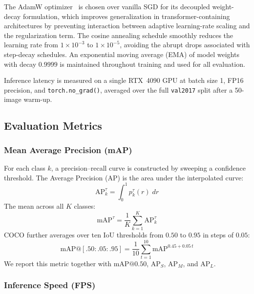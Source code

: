 The AdamW optimizer~\cite{loshchilov2019decoupled} is chosen
over vanilla SGD for its decoupled weight-decay formulation,
which improves generalization in transformer-containing
architectures by preventing interaction between adaptive
learning-rate scaling and the regularization term.  The cosine
annealing schedule smoothly reduces the learning rate from
$1 \times 10^{-3}$ to $1 \times 10^{-5}$, avoiding the abrupt
drops associated with step-decay schedules.  An exponential
moving average (EMA) of model weights with decay $0.9999$ is
maintained throughout training and used for all evaluation.

Inference latency is measured on a single RTX~4090 GPU at
batch size 1, FP16 precision, and \texttt{torch.no\_grad()},
averaged over the full \texttt{val2017} split after a 50-image
warm-up.

\subsection{Evaluation Metrics}

\subsubsection{Mean Average Precision (mAP)}

For each class $k$, a precision--recall curve is constructed
by sweeping a confidence threshold.  The Average Precision
(AP) is the area under the interpolated curve:
\begin{equation}
    \text{AP}_{k}^{\tau} =
    \int_{0}^{1} p_{k}^{\tau}(r)\; dr
    \label{eq:ap}
\end{equation}
The mean across all $K$ classes:
\begin{equation}
    \text{mAP}^{\tau} =
    \frac{1}{K}\sum_{k=1}^{K} \text{AP}_{k}^{\tau}
    \label{eq:map_tau}
\end{equation}
COCO further averages over ten IoU thresholds from $0.50$ to
$0.95$ in steps of $0.05$:
\begin{equation}
    \text{mAP}@[.50{:}.05{:}.95] =
    \frac{1}{10}\sum_{t=1}^{10}
    \text{mAP}^{0.45 + 0.05\,t}
    \label{eq:map_coco}
\end{equation}
We report this metric together with $\text{mAP}@0.50$,
$\text{AP}_{S}$, $\text{AP}_{M}$, and $\text{AP}_{L}$.

\subsubsection{Inference Speed (FPS)}


